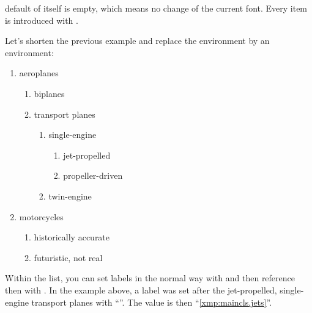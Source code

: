   default of  itself is empty, which means no
  change of the current font.%
   Every item is introduced with
  .%
  \IfThisCommonFirstRun{\iftrue}{\csname iffalse\endcsname}
    \begin{Example}
      Let's shorten the previous example and replace the
       environment by an
       environment:
      \begin{ShowOutput}[\baselineskip]
        \begin{enumerate}
        \item aeroplanes
          \begin{enumerate}
          \item biplanes
          \item transport planes
            \begin{enumerate}
            \item single-engine
              \begin{enumerate}
              \item jet-propelled\label{xmp:maincls.jets}
              \item propeller-driven
              \end{enumerate}
            \item twin-engine
            \end{enumerate}
          \end{enumerate}
          \item motorcycles
          \begin{enumerate}
             \item historically accurate
             \item futuristic, not real
          \end{enumerate}
        \end{enumerate}
      \end{ShowOutput}
      Within the list, you can set labels in the normal way with
       and then reference then with .
      In the example above, a label was set after the jet-propelled,
      single-engine transport planes with
      ``''. The  value is then
      ``\ref{xmp:maincls.jets}''.
    \end{Example}
  \fi%
  \EndIndexGroup


